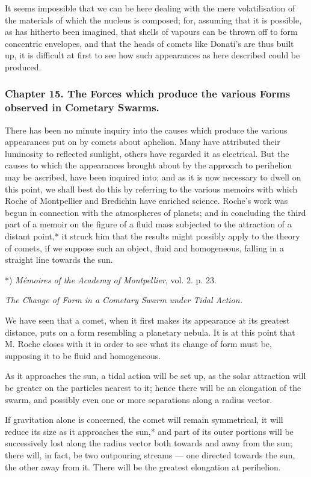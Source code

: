 \documentclass[a4paper, 12pt, oneside, polutonikogreek, english]{article}
\begin{document}
It seems impossible that we can be here dealing with the mere volatilisation of the materials of which the nucleus is composed; for, assuming that it is possible, as has hitherto been imagined, that shells of vapours can be thrown off to form concentric envelopes, and that the heads of comets like Donati's are thus built up, it is difficult at first to see how such appearances as here described could be produced.

\subsubsection{Chapter 15. The Forces which produce the various Forms observed in Cometary Swarms.}

There has been no minute inquiry into the causes which produce the various appearances put on by comets about aphelion. Many have attributed their luminosity to reflected sunlight, others have regarded it as electrical. But the causes to which the appearances brought about by the approach to perihelion may be ascribed, have been inquired into; and as it is now necessary to dwell on this point, we shall best do this by referring to the various memoirs with which Roche of Montpellier and Bredichin have enriched science. Roche's work was begun in connection with the atmospheres of planets; and in concluding the third part of a memoir on the figure of a fluid mass subjected to the attraction of a distant point,* it struck him that the results might possibly apply to the theory of comets, if we suppose such an object, fluid and homogeneous, falling in a straight line towards the sun.

*) \emph{Mémoires of the Academy of Montpellier}, vol. 2. p. 23.

\emph{The Change of Form in a Cometary Swarm under Tidal Action.}

We have seen that a comet, when it first makes its appearance at its greatest distance, puts on a form resembling a planetary nebula. It is at this point that M. Roche closes with it in order to see what its change of form must be, supposing it to be fluid and homogeneous.

As it approaches the sun, a tidal action will be set up, as the solar attraction will be greater on the particles nearest to it; hence there will be an elongation of the swarm, and possibly even one or more separations along a radius vector.

If gravitation alone is concerned, the comet will remain symmetrical, it will reduce its size as it approaches the sun,* and part of its outer portions will be successively lost along the radius vector both towards and away from the sun; there will, in fact, be two outpouring streams --- one directed towards the sun, the other away from it. There will be the greatest elongation at perihelion.
\end{document}
